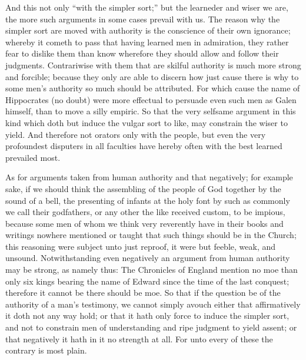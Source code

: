 And this not only “with the simpler sort;” but the learneder and wiser we are, the more such arguments in some cases prevail with us. The reason why the simpler sort are moved with authority is the conscience of their own ignorance; whereby it cometh to pass that having learned men in admiration, they rather fear to dislike them than know wherefore they should allow and follow their judgments. Contrariwise with them that are skilful authority is much more strong and forcible; because they only are able to discern how just cause there is why to some men’s authority so much should be attributed. For which cause the name of Hippocrates (no doubt) were more effectual to persuade even such men as Galen himself, than to move a silly empiric. So that the very selfsame argument in this kind which doth but induce the vulgar sort to like, may constrain the wiser to yield. And therefore not orators only with the people, but even the very  profoundest disputers in all faculties have hereby often with the best learned prevailed most.

As for arguments taken from human authority and that negatively; for example sake, if we should think the assembling of the people of God together by the sound of a bell, the presenting of infants at the holy font by such as commonly we call their godfathers, or any other the like received custom, to be impious, because some men of whom we think very reverently have in their books and writings nowhere mentioned or taught that such things should be in the Church; this reasoning were subject unto just reproof, it were but feeble, weak, and unsound. Notwithstanding even negatively an argument from human authority may be strong, as namely thus: The Chronicles of England mention no moe than only six kings bearing the name of Edward since the time of the last conquest; therefore it cannot be there should be moe. So that if the question be of the authority of a man’s testimony, we cannot simply avouch either that affirmatively it doth not any way hold; or that it hath only force to induce the simpler sort, and not to constrain men of understanding and ripe judgment to yield assent; or that negatively it hath in it no strength at all. For unto every of these the contrary is most plain.


